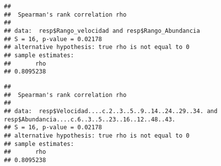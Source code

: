 \documentclass[
]{article}
\newenvironment{Shaded}{\begin{snugshade}}{\end{snugshade}}
\newcommand{\AttributeTok}[1]{\textcolor[rgb]{0.13,0.29,0.53}{#1}}
\newcommand{\CommentTok}[1]{\textcolor[rgb]{0.56,0.35,0.01}{\textit{#1}}}
\newcommand{\DecValTok}[1]{\textcolor[rgb]{0.00,0.00,0.81}{#1}}
\newcommand{\FloatTok}[1]{\textcolor[rgb]{0.00,0.00,0.81}{#1}}
\newcommand{\FunctionTok}[1]{\textcolor[rgb]{0.13,0.29,0.53}{\textbf{#1}}}
\newcommand{\NormalTok}[1]{#1}
\newcommand{\SpecialCharTok}[1]{\textcolor[rgb]{0.81,0.36,0.00}{\textbf{#1}}}
\newcommand{\StringTok}[1]{\textcolor[rgb]{0.31,0.60,0.02}{#1}}
\begin{document}
\begin{Shaded}
\end{Shaded}

\begin{verbatim}
## 
##  Spearman's rank correlation rho
## 
## data:  resp$Rango_velocidad and resp$Rango_Abundancia
## S = 16, p-value = 0.02178
## alternative hypothesis: true rho is not equal to 0
## sample estimates:
##       rho 
## 0.8095238
\end{verbatim}

\begin{Shaded}
\end{Shaded}

\begin{verbatim}
## 
##  Spearman's rank correlation rho
## 
## data:  resp$Velocidad....c.2..3..5..9..14..24..29..34. and resp$Abundancia....c.6..3..5..23..16..12..48..43.
## S = 16, p-value = 0.02178
## alternative hypothesis: true rho is not equal to 0
## sample estimates:
##       rho 
## 0.8095238
\end{verbatim}
\end{document}
